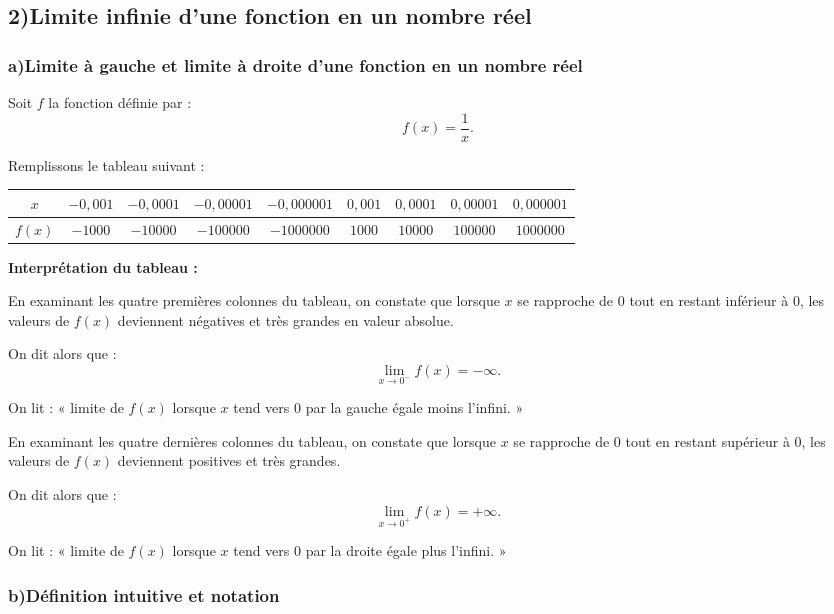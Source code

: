 \documentclass[12pt,a4paper]{article}
\begin{document}
\subsection*{2)\quad Limite infinie d’une fonction en un nombre réel}

\subsubsection*{a)\quad Limite à gauche et limite à droite d’une fonction en un nombre réel}

Soit $f$ la fonction définie par :
\[
f(x)=\frac{1}{x}.
\]

Remplissons le tableau suivant :

\begin{center}
\begin{tabular}{|c|c|c|c|c|c|c|c|c|}
\hline
$x$ & $-0{,}001$ & $-0{,}0001$ & $-0{,}00001$ & $-0{,}000001$ 
& $0{,}001$ & $0{,}0001$ & $0{,}00001$ & $0{,}000001$ \\
\hline
$f(x)$ 
& $-1000$ 
& $-10000$ 
& $-100000$ 
& $-1000000$ 
& $1000$ 
& $10000$ 
& $100000$ 
& $1000000$ \\
\hline
\end{tabular}
\end{center}

\textbf{Interprétation du tableau :}

\medskip

En examinant les quatre premières colonnes du tableau, on constate que lorsque $x$ se rapproche de $0$ tout en restant inférieur à $0$, les valeurs de $f(x)$ deviennent négatives et très grandes en valeur absolue.

On dit alors que :
\[
\lim_{x\to 0^-} f(x) = -\infty.
\]

On lit : « limite de $f(x)$ lorsque $x$ tend vers $0$ par la gauche égale moins l’infini. »

\medskip

En examinant les quatre dernières colonnes du tableau, on constate que lorsque $x$ se rapproche de $0$ tout en restant supérieur à $0$, les valeurs de $f(x)$ deviennent positives et très grandes.

On dit alors que :
\[
\lim_{x\to 0^+} f(x) = +\infty.
\]

On lit : « limite de $f(x)$ lorsque $x$ tend vers $0$ par la droite égale plus l’infini. »

\subsubsection*{b)\quad Définition intuitive et notation}
\end{document}
